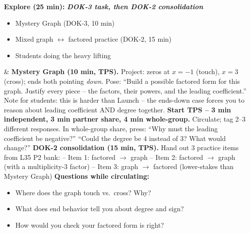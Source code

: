 \documentclass[11pt]{article}
\begin{document}
\begin{xltabular}{\textwidth}
\textbf{Explore (25 min):} \newline \textbf{\textit{DOK-3 task, then DOK-2 consolidation}}
\begin{itemize}[label=$\bullet$, leftmargin=*, nosep]
    \item Mystery Graph (DOK-3, 10 min)
    \item Mixed graph $\leftrightarrow$ factored practice (DOK-2, 15 min)
    \item Students doing the heavy lifting
\end{itemize} &
\textbf{Mystery Graph (10 min, TPS).} Project: zeros at $x=-1$ (touch), $x=3$ (cross); ends both pointing \emph{down}. \newline\newline
Pose: ``Build a possible factored form for this graph. Justify every piece -- the factors, their powers, and the leading coefficient.'' Note for students: this is harder than Launch -- the ends-down case forces you to reason about leading coefficient AND degree together. \newline\newline
\textbf{Start TPS -- 3 min independent, 3 min partner share, 4 min whole-group.} \newline\newline
Circulate; tag 2--3 different responses. In whole-group share, press: ``Why must the leading coefficient be negative?'' ``Could the degree be 4 instead of 3? What would change?'' \newline\newline
\textbf{DOK-2 consolidation (15 min, TPS).} Hand out 3 practice items from L35 P2 bank: \newline
-- Item 1: factored $\rightarrow$ graph \newline
-- Item 2: factored $\rightarrow$ graph (with a multiplicity-3 factor) \newline
-- Item 3: graph $\rightarrow$ factored (lower-stakes than Mystery Graph) \newline\newline
\textbf{Questions while circulating:}
\begin{itemize}[label=$\bullet$, leftmargin=*, nosep]
    \item Where does the graph touch vs.\ cross? Why?
    \item What does end behavior tell you about degree and sign?
    \item How would you check your factored form is right?
\end{itemize}

\end{xltabular}
\end{document}
